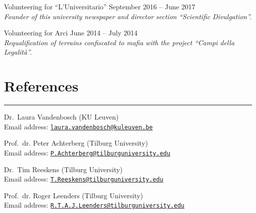 \documentclass[12pt,]{article}
\begin{document}
Volunteering for ``L'Universitario''
\hfill \begingroup\small September 2016 – June 2017\endgroup\\
\emph{Founder of this university newspaper and director section
``Scientific Divulgation''.}

Volunteering for Arci
\hfill \begingroup\small June 2014 – July 2014\endgroup\\
\emph{Requalification of terrains confiscated to mafia with the project
``Campi della Legalità''.}

\hypertarget{references}{%
\section{References}\label{references}}

\vspace{-10pt}
\rule{1\linewidth}{\linethickness}

Dr.~Laura Vandenbosch (KU Leuven)\\
Email address:
\href{mailto:laura.vandenbosch@kuleuven.be}{\nolinkurl{laura.vandenbosch@kuleuven.be}}

Prof.~dr. Peter Achterberg (Tilburg University)\\
Email address:
\href{mailto:P.Achterberg@tilburguniversity.edu}{\nolinkurl{P.Achterberg@tilburguniversity.edu}}

Dr.~Tim Reeskens (Tilburg University)\\
Email address:
\href{mailto:T.Reeskens@tilburguniversity.edu}{\nolinkurl{T.Reeskens@tilburguniversity.edu}}

Prof.~dr. Roger Leenders (Tilburg University)\\
Email address:
\href{mailto:R.T.A.J.Leenders@tilburguniversity.edu}{\nolinkurl{R.T.A.J.Leenders@tilburguniversity.edu}}
\end{document}
